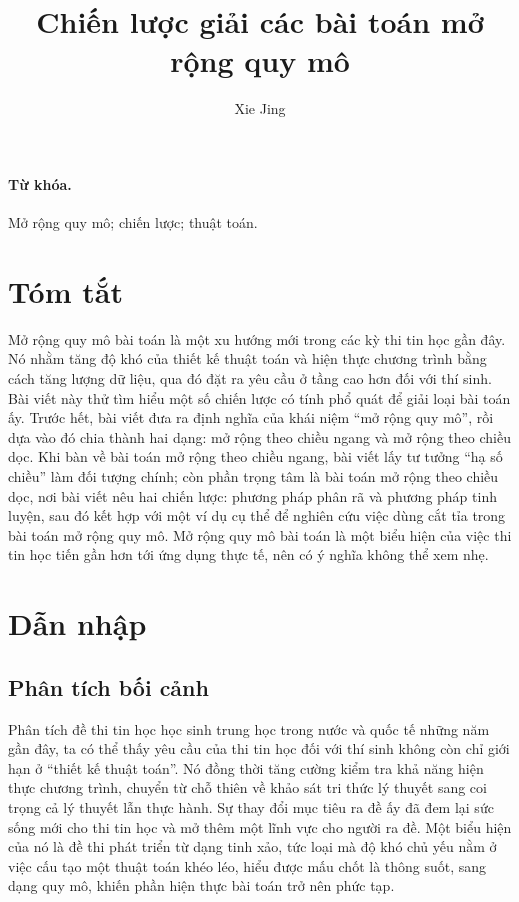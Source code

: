 \documentclass[11pt]{article}
\title{Chiến lược giải các bài toán mở rộng quy mô}
\author{Xie Jing}
\date{}
\begin{document}
\maketitle


\paragraph{Từ khóa.}
Mở rộng quy mô; chiến lược; thuật toán.

\section*{Tóm tắt}

Mở rộng quy mô bài toán là một xu hướng mới trong các kỳ thi tin học gần đây.
Nó nhằm tăng độ khó của thiết kế thuật toán và hiện thực chương trình bằng
cách tăng lượng dữ liệu, qua đó đặt ra yêu cầu ở tầng cao hơn đối với thí
sinh. Bài viết này thử tìm hiểu một số chiến lược có tính phổ quát để giải
loại bài toán ấy. Trước hết, bài viết đưa ra định nghĩa của khái niệm
``mở rộng quy mô'', rồi dựa vào đó chia thành hai dạng: mở rộng theo chiều
ngang và mở rộng theo chiều dọc. Khi bàn về bài toán mở rộng theo chiều
ngang, bài viết lấy tư tưởng ``hạ số chiều'' làm đối tượng chính; còn phần
trọng tâm là bài toán mở rộng theo chiều dọc, nơi bài viết nêu hai chiến
lược: phương pháp phân rã và phương pháp tinh luyện, sau đó kết hợp với một
ví dụ cụ thể để nghiên cứu việc dùng cắt tỉa trong bài toán mở rộng quy mô.
Mở rộng quy mô bài toán là một biểu hiện của việc thi tin học tiến gần hơn
tới ứng dụng thực tế, nên có ý nghĩa không thể xem nhẹ.

\tableofcontents

\section{Dẫn nhập}

\subsection{Phân tích bối cảnh}

Phân tích đề thi tin học học sinh trung học trong nước và quốc tế những năm
gần đây, ta có thể thấy yêu cầu của thi tin học đối với thí sinh không còn
chỉ giới hạn ở ``thiết kế thuật toán''. Nó đồng thời tăng cường kiểm tra khả
năng hiện thực chương trình, chuyển từ chỗ thiên về khảo sát tri thức lý
thuyết sang coi trọng cả lý thuyết lẫn thực hành. Sự thay đổi mục tiêu ra đề
ấy đã đem lại sức sống mới cho thi tin học và mở thêm một lĩnh vực cho người
ra đề. Một biểu hiện của nó là đề thi phát triển từ dạng tinh xảo, tức loại
mà độ khó chủ yếu nằm ở việc cấu tạo một thuật toán khéo léo, hiểu được mấu
chốt là thông suốt, sang dạng quy mô, khiến phần hiện thực bài toán trở nên
phức tạp.
\end{document}
